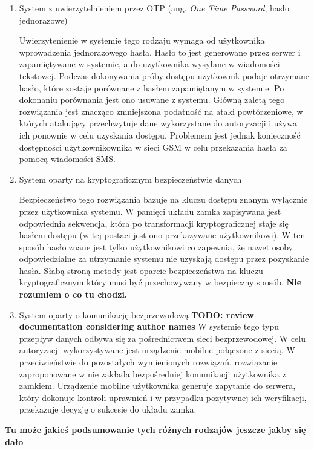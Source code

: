 \begin{enumerate}[label=\Alph*.]
			\item System z uwierzytelnieniem przez OTP (ang. \textit{One Time Password}, hasło jednorazowe)

				Uwierzytenienie w systemie tego rodzaju wymaga od użytkownika wprowadzenia jednorazowego hasła. Hasło to jest generowane przez serwer i zapamiętywane w systemie, a do użytkownika wysyłane w wiadomości tekstowej. Podczas dokonywania próby dostępu użytkownik podaje otrzymane hasło, które zostaje porównane z hasłem zapamiętanym w systemie. Po dokonaniu porównania jest ono usuwane z systemu. Główną zaletą tego rozwiązania jest znacząco zmniejszona podatność na ataki powtórzeniowe, w których atakujący przechwytuje dane wykorzystane do autoryzacji i używa ich ponownie w celu uzyskania dostępu. Problemem jest jednak konieczność dostępności użytkownikownika w sieci GSM w celu przekazania hasła za pomocą wiadomości SMS.

			\item System oparty na kryptograficznym bezpieczeństwie danych

				Bezpieczeństwo tego rozwiązania bazuje na kluczu dostępu znanym wyłącznie przez użytkownika systemu. W pamięci układu zamka zapisywana jest odpowiednia sekwencja, która po transformacji kryptograficznej staje się hasłem dostępu (w tej postaci jest ono przekazywane użytkownikowi). W ten sposób hasło znane jest tylko użytkownikowi co zapewnia, że nawet osoby odpowiedzialne za utrzymanie systemu nie uzyskają dostępu przez pozyskanie hasła. Słabą stroną metody jest oparcie bezpieczeństwa na kluczu kryptograficznym który musi być przechowywany w bezpieczny sposób. \textbf{Nie rozumiem o co tu chodzi.}

			\item System oparty o komunikację bezprzewodową
				\textbf{TODO: review documentation considering author names}
				W systemie tego typu przepływ danych odbywa się za pośrednictwem sieci bezprzewodowej. W celu autoryzacji wykorzystywane jest urządzenie mobilne połączone z siecią. W przeciwieństwie do pozostałych wymienionych rozwiązań, rozwiązanie zaproponowane w \cite{cryptographic-iot-access-system} nie zakłada bezpośredniej komunikacji użytkownika z zamkiem. Urządzenie mobilne użytkownika generuje zapytanie do serwera, który dokonuje kontroli uprawnień i w przypadku pozytywnej ich weryfikacji, przekazuje decyzję o sukcesie do układu zamka.

		\end{enumerate}

		\textbf{Tu może jakieś podsumowanie tych różnych rodzajów jeszcze jakby się dało}

